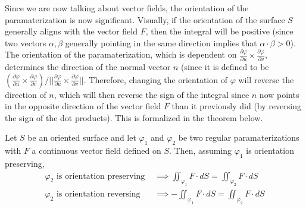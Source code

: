   Since we are now talking about vector fields, the orientation of the paramaterization is now significant. Visually, if the orientation of the surface $S$ generally aligns with the vector field $F$, then the integral will be positive (since two vectors $\alpha, \beta$ generally pointing in the same direction implies that $\alpha \cdot \beta > 0$). The orientation of the paramaterization, which is dependent on $\frac{\partial \varphi}{\partial u} \times \frac{\partial \varphi}{\partial v}$, determines the direction of the normal vector $n$ (since it is defined to be $(\frac{\partial \varphi}{\partial u} \times \frac{\partial \varphi}{\partial v}) / \big|\big|\frac{\partial \varphi}{\partial u} \times \frac{\partial \varphi}{\partial v}\big|\big|$. Therefore, changing the orientation of $\varphi$ will reverse the direction of $n$, which will then reverse the sign of the integral since $n$ now points in the opposite direction of the vector field $F$ than it previously did (by reversing the sign of the dot products). This is formalized in the theorem below. 

  \begin{theorem}
  Let $S$ be an oriented surface and let $\varphi_1$ and $\varphi_2$ be two regular paramaterizations with $F$ a continuous vector field defined on $S$. Then, assuming $\varphi_1$ is orientation preserving, 
  \begin{align*}
      \varphi_2 \text{ is orientation preserving } & \implies \iint_{\varphi_1} F \cdot d S = \iint_{\varphi_2} F \cdot d S \\
      \varphi_2 \text{ is orientation reversing } & \implies - \iint_{\varphi_1} F \cdot d S = \iint_{\varphi_2} F \cdot d S 
  \end{align*}
  \end{theorem}


